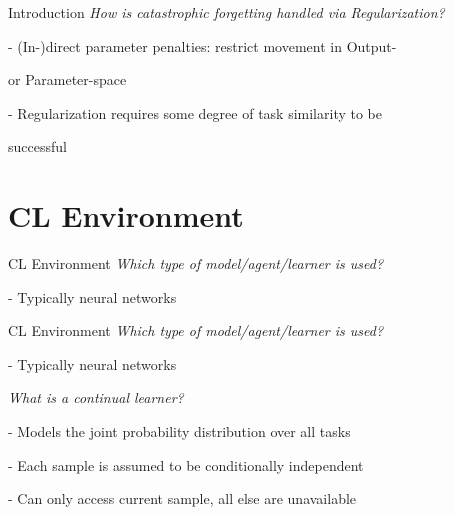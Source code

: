 \documentclass{beamer}
\begin{document}
\begin{frame}[t]{Introduction}
	\vspace{0.5cm}
	\textit{How is catastrophic forgetting handled via Regularization?}
	
	\vspace{0.25cm}
	\quad - (In-)direct parameter penalties: restrict movement in Output- 
	
	\quad or Parameter-space
	
	\vspace{0.25cm}
	\quad - Regularization requires some degree of task similarity to be
	
	\quad successful
			
\end{frame}

\section{CL Environment}

\begin{frame}[t]{CL Environment}
	\textit{Which type of model/agent/learner is used?}
	
	\vspace{0.25cm}
	\quad - Typically neural networks
	
\end{frame}

\begin{frame}[t]{CL Environment}
	\textit{Which type of model/agent/learner is used?}
	
	\vspace{0.25cm}
	\quad - Typically neural networks
	
	\vspace{0.5cm}
	\textit{What is a continual learner? \cite{LW}} 
	
	\vspace{0.25cm}
	\quad - Models the joint probability distribution over all tasks
	
	\quad - Each sample is assumed to be conditionally independent
	
	\quad - Can only access current sample, all else are unavailable
	
\end{frame}
\end{document}

